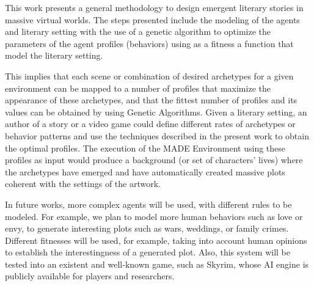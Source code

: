 \documentclass{sig-alternate}
\begin{document}
This work presents a general methodology to design emergent literary stories in massive virtual worlds. The steps presented include the modeling of the agents and literary setting with the use of a genetic algorithm to optimize the parameters of the agent profiles (behaviors) using
as a fitness a function that model the literary setting. %

This implies that each scene or combination of desired archetypes for a given
environment can be mapped to a number of profiles that maximize the appearance
of these archetypes, and that the fittest number of profiles and its values can
be obtained by using Genetic Algorithms.  
Given a literary setting, an author of a story or a video game could define 
different rates of archetypes or behavior patterns and use the techniques described in
the present work to obtain the optimal profiles. The execution of the MADE Environment
using these profiles as input would produce a background (or set of characters' lives)
where the archetypes have emerged and have automatically created massive plots coherent
with the settings of the artwork.

In future works, more complex agents will be used, with different rules to be modeled. For example, we plan to model more human behaviors such as love or envy, to generate interesting plots such as wars, weddings, or family crimes. Different fitnesses will be used, for example, taking into account human opinions to establish the interestingness of a generated plot. Also, this system will be tested into an existent and well-known game, such as Skyrim\texttrademark, whose AI engine is publicly available for players and researchers.




%



\end{document}
